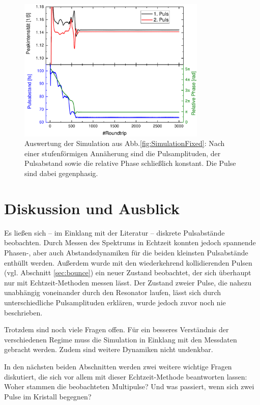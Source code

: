 \documentclass[bachelor,       %
               twoside,        %
               BCOR10mm,       %
               liststotoc,nomtotoc,bibtotoc, %
               english,ngerman, %
               final,          %
               ]{GAUBM}
\begin{document}
\begin{figure}[!htb]
	\centering
	\includegraphics[width=0.8\textwidth]{figures/SimRBFixed}
	\caption{Auswertung der Simulation aus Abb.\ref{fig:SimulationFixed}: Nach einer stufenförmigen Annäherung sind die Pulsamplituden, der Pulsabstand sowie die relative Phase schließlich konstant. Die Pulse sind dabei gegenphasig.}
	\label{fig:SimRBFix}
\end{figure}

\chapter{Diskussion und Ausblick}
Es ließen sich -- im Einklang mit der Literatur -- diskrete Pulsabstände  beobachten.
Durch Messen des Spektrums in Echtzeit konnten jedoch spannende Phasen-, aber auch Abstandsdynamiken für die beiden kleinsten Pulsabstände enthüllt werden.
Außerdem wurde mit den wiederkehrend kollidierenden Pulsen (vgl. Abschnitt \ref{sec:bounce}) ein neuer Zustand beobachtet, der sich überhaupt nur mit Echtzeit-Methoden messen lässt.
Der Zustand zweier Pulse, die nahezu unabhängig voneinander durch den Resonator laufen, lässt sich durch unterschiedliche Pulsamplituden erklären, wurde jedoch zuvor noch nie beschrieben.

Trotzdem sind noch viele Fragen offen.
Für ein besseres Verständnis der verschiedenen Regime muss die Simulation in Einklang mit den Messdaten gebracht werden.
Zudem sind weitere Dynamiken nicht undenkbar.

In den nächsten beiden Abschnitten werden zwei weitere wichtige Fragen diskutiert, die sich vor allem mit dieser Echtzeit-Methode beantworten lassen:
Woher stammen die beobachteten Multipulse? Und was passiert, wenn sich zwei Pulse im Kristall begegnen?
\end{document}
